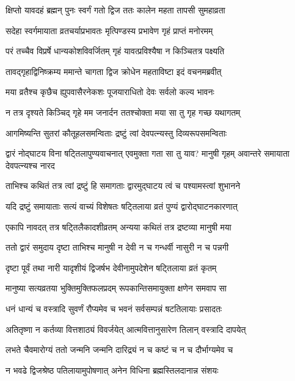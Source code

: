 \twolineshloka
{क्षिप्तो यावदहं ब्रह्मन् पुनः स्वर्गं गतो द्विज}
{ततः कालेन महता तापसी सुमहाव्रता} %

\twolineshloka
{सदेहा स्वर्गमायाता व्रतचर्याप्रभावतः}
{मृत्पिण्डस्य प्रभावेण गृहं प्राप्तं मनोरमम्} %

\twolineshloka
{परं तच्चैव विप्रर्षे धान्यकोशविवर्जितम्}
{गृहं यावत्प्रविश्यैषा न किञ्चितत्र पक्ष्यति} %

\twolineshloka
{तावद्गृहाद्विनिष्क्रम्य ममान्ते चागता द्विज}
{क्रोधेन महताविष्टा इदं वचनमब्रवीत्} %

\twolineshloka
{मया व्रतैश्च कृछैच ह्युपवासैरनेकशः}
{पूजयाराधितो देवः सर्वलो कल्य भावनः} %

\twolineshloka
{न तत्र दृश्यते किञ्चिद् गृहे मम जनार्दन}
{ततश्चोक्ता मया सा तु गृह गच्छ यथागतम्} %

\twolineshloka
{आगमिष्यन्ति सुतरां कौतूहलसमन्विताः}
{द्रष्टुं त्वां देवपत्न्यस्तु दिव्यरूपसमन्विताः} %


\threelineshloka
{द्वारं नोद्घाटय विना षट्तिलापुण्यवाचनात्}
{एवमुक्ता गता सा तु याव? मानुषी गृहम्}
{अवान्तरे समायाता देवपत्न्यश्च नारद} %

\twolineshloka
{ताभिश्च कथितं तत्र त्वां द्रष्टुं हि समागताः}
{द्वारमुद्घाटय त्वं च पश्यामस्त्वां शुभानने} %


\twolineshloka
{यदि द्रष्टुं समायाताः सत्यं वाच्यं विशेषतः}
{षट्तिलाया व्रतं पुण्यं द्वारोद्घाटनकारणात्} %

\twolineshloka
{एकापि नावदत् तत्र षट्तिलैकादशीव्रतम्}
{अन्यया कथितं तत्र द्रष्टव्या मानुषी मया} %

\twolineshloka
{ततो द्वारं समुदाय दृष्टा ताभिश्च मानुषी}
{न देवी न च गन्धर्वी नासुरी न च पन्नगी} %

\twolineshloka
{दृष्टा पूर्वं तथा नारी यादृशीयं द्विजर्षभ}
{देवीनामुपदेशेन षट्तिलाया व्रतं कृतम्} %

\twolineshloka
{मानुष्या सत्यव्रतया भुक्तिमुक्तिफलप्रदम्}
{रूपकान्तिसमायुक्ता क्षणेन समवाप सा} %

\twolineshloka
{धनं धान्यं च वस्त्रादि सुवर्णं रौप्यमेव च}
{भवनं सर्वसम्पन्नं षटतिलायाः प्रसादतः} %

\twolineshloka
{अतितृष्णा न कर्तव्या वित्तशाठ्यं विवर्जयेत्}
{आत्मवित्तानुसारेण तिलान् वस्त्रादि दापयेत्} %

\twolineshloka
{लभते चैवमारोग्यं ततो जन्मनि जन्मनि}
{दारिद्र्यं न च कष्टं च न च दौर्भाग्यमेव च} %

\twolineshloka
{न भवढे द्विजश्रेष्ठ पतिलायामुपोषणात्}
{अनेन विधिना ब्रह्मस्तिलदानान्न संशयः} %

